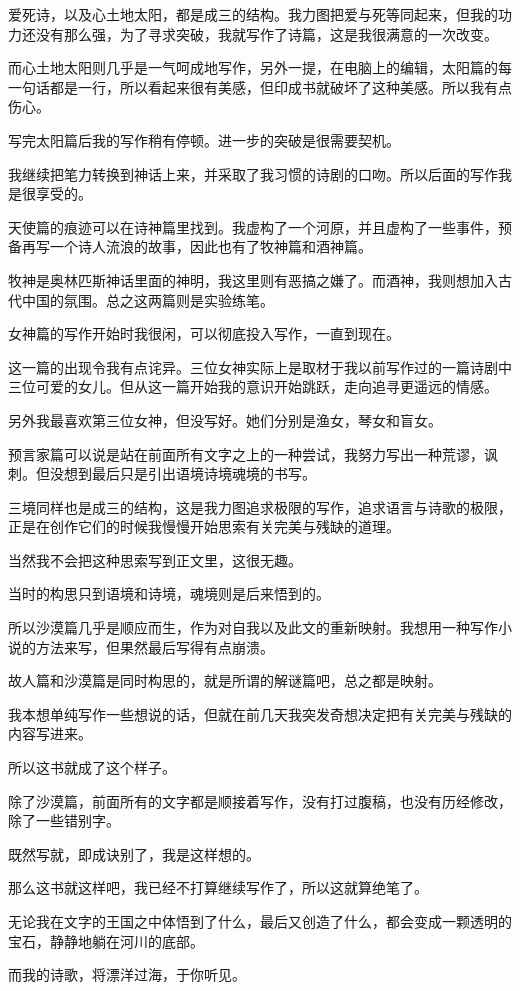 \documentclass[UTF8]{article}
\begin{document}
\par 爱死诗，以及心土地太阳，都是成三的结构。我力图把爱与死等同起来，但我的功力还没有那么强，为了寻求突破，我就写作了诗篇，这是我很满意的一次改变。
\par 而心土地太阳则几乎是一气呵成地写作，另外一提，在电脑上的编辑，太阳篇的每一句话都是一行，所以看起来很有美感，但印成书就破坏了这种美感。所以我有点伤心。
\par 写完太阳篇后我的写作稍有停顿。进一步的突破是很需要契机。
\par 我继续把笔力转换到神话上来，并采取了我习惯的诗剧的口吻。所以后面的写作我是很享受的。
\par 天使篇的痕迹可以在诗神篇里找到。我虚构了一个河原，并且虚构了一些事件，预备再写一个诗人流浪的故事，因此也有了牧神篇和酒神篇。
\par 牧神是奥林匹斯神话里面的神明，我这里则有恶搞之嫌了。而酒神，我则想加入古代中国的氛围。总之这两篇则是实验练笔。
\par 女神篇的写作开始时我很闲，可以彻底投入写作，一直到现在。
\par 这一篇的出现令我有点诧异。三位女神实际上是取材于我以前写作过的一篇诗剧中三位可爱的女儿。但从这一篇开始我的意识开始跳跃，走向追寻更遥远的情感。
\par 另外我最喜欢第三位女神，但没写好。她们分别是渔女，琴女和盲女。
\par 预言家篇可以说是站在前面所有文字之上的一种尝试，我努力写出一种荒谬，讽刺。但没想到最后只是引出语境诗境魂境的书写。
\par 三境同样也是成三的结构，这是我力图追求极限的写作，追求语言与诗歌的极限，正是在创作它们的时候我慢慢开始思索有关完美与残缺的道理。
\par 当然我不会把这种思索写到正文里，这很无趣。
\par 当时的构思只到语境和诗境，魂境则是后来悟到的。
\par 所以沙漠篇几乎是顺应而生，作为对自我以及此文的重新映射。我想用一种写作小说的方法来写，但果然最后写得有点崩溃。
\par 故人篇和沙漠篇是同时构思的，就是所谓的解谜篇吧，总之都是映射。
\par 我本想单纯写作一些想说的话，但就在前几天我突发奇想决定把有关完美与残缺的内容写进来。
\par 所以这书就成了这个样子。
\par 除了沙漠篇，前面所有的文字都是顺接着写作，没有打过腹稿，也没有历经修改，除了一些错别字。
\par 既然写就，即成诀别了，我是这样想的。
\\[0.6cm]
\par 那么这书就这样吧，我已经不打算继续写作了，所以这就算绝笔了。
\par 无论我在文字的王国之中体悟到了什么，最后又创造了什么，都会变成一颗透明的宝石，静静地躺在河川的底部。
\par 而我的诗歌，将漂洋过海，于你听见。
\end{document}
